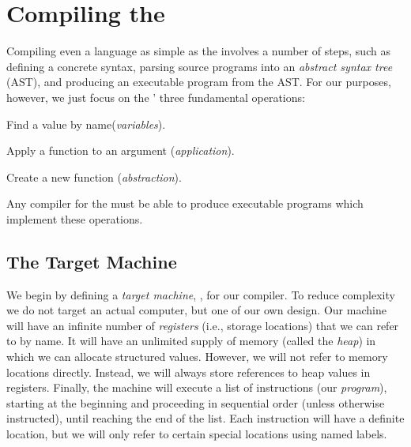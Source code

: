 \documentclass[12pt]{report}
\begin{document}

\section{Compiling the \LamA}

Compiling even a language as simple as the \lamA involves a number of
steps, such as defining a concrete syntax, parsing source programs
into an \emph{abstract syntax tree} (AST), and producing an executable
program from the AST. For our purposes, however, we just focus on the
\lamA' three fundamental operations:
\begin{description}
\item Find a value by name(\emph{variables}).
\item Apply a function to an argument (\emph{application}).
\item Create a new function (\emph{abstraction}). 
\end{description}
Any compiler for the \lamA must be able to produce executable programs
which implement these operations. 

\subsection{The Target Machine}
We begin by defining a \emph{target machine}, \machLam, for our compiler. To
reduce complexity we do not target an actual computer, but one of our
own design. Our machine will have an infinite number of
\emph{registers} (i.e., storage locations) that we can refer to by
name. It will have an unlimited supply of memory (called the
\emph{heap}) in which we can allocate structured values. However, we
will not refer to memory locations directly. Instead, we will always
store references to heap values in registers. Finally, the machine
will execute a list of instructions (our \emph{program}), starting at
the beginning and proceeding in sequential order (unless otherwise
instructed), until reaching the end of the list. Each instruction will
have a definite location, but we will only refer to certain special
locations using named labels.
\end{document}

